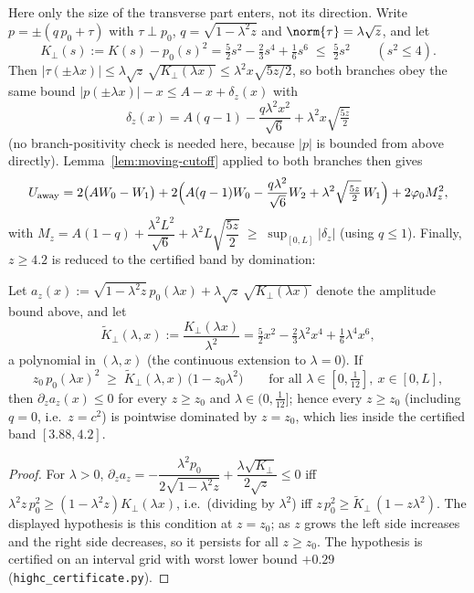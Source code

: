Here only the size of the transverse part enters, not its direction. Write $p=\pm(q\,p_0+\tau)$ with $\tau\perp p_0$, $q=\sqrt{1-\lambda^2z}$ and $\norm{\tau}=\lambda\sqrt z$, and let
\[
        K_\perp(s):=K(s)-p_0(s)^2=\tfrac52s^2-\tfrac23s^4+\tfrac16s^6\;\le\;\tfrac52s^2
        \qquad(s^2\le4).
\]
Then $|\tau(\pm\lambda x)|\le\lambda\sqrt z\,\sqrt{K_\perp(\lambda x)}\le\lambda^2x\sqrt{5z/2}$, so both branches obey the same bound $|p(\pm\lambda x)|-x\le A-x+\delta_z(x)$ with
\[
        \delta_z(x)=A(q-1)-\frac{q\lambda^2x^2}{\sqrt6}+\lambda^2x\sqrt{\tfrac{5z}2}
\]
(no branch-positivity check is needed here, because $|p|$ is bounded from above directly). Lemma~\ref{lem:moving-cutoff} applied to both branches then gives
\[
        U_{\mathrm{away}}
        =2\bigl(AW_0-W_1\bigr)+2\Bigl(A(q-1)W_0-\frac{q\lambda^2}{\sqrt6}W_2+\lambda^2\sqrt{\tfrac{5z}2}\,W_1\Bigr)
        +2\varphi_0M_z^2,
\]
with $M_z=A(1-q)+\dfrac{\lambda^2L^2}{\sqrt6}+\lambda^2L\sqrt{\dfrac{5z}2}\;\ge\;\sup_{[0,L]}|\delta_z|$ (using $q\le1$). Finally, $z\ge4.2$ is reduced to the certified band by domination:

\begin{lemma}[Domination for $z\ge z_0=4.2$]\label{lem:domination}
Let $a_z(x):=\sqrt{1-\lambda^2z}\,p_0(\lambda x)+\lambda\sqrt z\,\sqrt{K_\perp(\lambda x)}$ denote the amplitude bound above, and let
\[
        \widetilde K_\perp(\lambda,x):=\frac{K_\perp(\lambda x)}{\lambda^2}
        =\tfrac52x^2-\tfrac23\lambda^2x^4+\tfrac16\lambda^4x^6,
\]
a polynomial in $(\lambda,x)$ (the continuous extension to $\lambda=0$). If
\[
        z_0\,p_0(\lambda x)^2\;\ge\;\widetilde K_\perp(\lambda,x)\,\bigl(1-z_0\lambda^2\bigr)
        \qquad\text{for all }\lambda\in[0,\tfrac1{12}],\ x\in[0,L],
\]
then $\partial_za_z(x)\le0$ for every $z\ge z_0$ and $\lambda\in(0,\tfrac1{12}]$; hence every $z\ge z_0$ (including $q=0$, i.e.\ $z=c^2$) is pointwise dominated by $z=z_0$, which lies inside the certified band $[3.88,4.2]$.
\end{lemma}

\begin{proof}
For $\lambda>0$, $\partial_za_z=-\dfrac{\lambda^2p_0}{2\sqrt{1-\lambda^2z}}+\dfrac{\lambda\sqrt{K_\perp}}{2\sqrt z}\le0$ iff $\lambda^2z\,p_0^2\ge(1-\lambda^2z)K_\perp(\lambda x)$, i.e.\ (dividing by $\lambda^2$) iff $z\,p_0^2\ge\widetilde K_\perp\,(1-z\lambda^2)$. The displayed hypothesis is this condition at $z=z_0$; as $z$ grows the left side increases and the right side decreases, so it persists for all $z\ge z_0$. The hypothesis is certified on an interval grid with worst lower bound $+0.29$ (\texttt{highc\_certificate.py}).
\end{proof}

